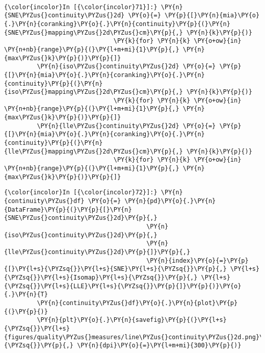     \begin{center}
    \end{center}
    { \hspace*{\fill} \\}

    \begin{Verbatim}[commandchars=\\\{\}]
{\color{incolor}In [{\color{incolor}71}]:} \PY{n}{SNE\PYZus{}continuity\PYZus{}2d} \PY{o}{=} \PY{p}{[}\PY{n}{mia}\PY{o}{.}\PY{n}{coranking}\PY{o}{.}\PY{n}{continuity}\PY{p}{(}\PY{n}{SNE\PYZus{}mapping\PYZus{}2d\PYZus{}cm}\PY{p}{,} \PY{n}{k}\PY{p}{)}
                              \PY{k}{for} \PY{n}{k} \PY{o+ow}{in} \PY{n+nb}{range}\PY{p}{(}\PY{l+m+mi}{1}\PY{p}{,} \PY{n}{max\PYZus{}k}\PY{p}{)}\PY{p}{]}
         \PY{n}{iso\PYZus{}continuity\PYZus{}2d} \PY{o}{=} \PY{p}{[}\PY{n}{mia}\PY{o}{.}\PY{n}{coranking}\PY{o}{.}\PY{n}{continuity}\PY{p}{(}\PY{n}{iso\PYZus{}mapping\PYZus{}2d\PYZus{}cm}\PY{p}{,} \PY{n}{k}\PY{p}{)}
                              \PY{k}{for} \PY{n}{k} \PY{o+ow}{in} \PY{n+nb}{range}\PY{p}{(}\PY{l+m+mi}{1}\PY{p}{,} \PY{n}{max\PYZus{}k}\PY{p}{)}\PY{p}{]}
         \PY{n}{lle\PYZus{}continuity\PYZus{}2d} \PY{o}{=} \PY{p}{[}\PY{n}{mia}\PY{o}{.}\PY{n}{coranking}\PY{o}{.}\PY{n}{continuity}\PY{p}{(}\PY{n}{lle\PYZus{}mapping\PYZus{}2d\PYZus{}cm}\PY{p}{,} \PY{n}{k}\PY{p}{)}
                              \PY{k}{for} \PY{n}{k} \PY{o+ow}{in} \PY{n+nb}{range}\PY{p}{(}\PY{l+m+mi}{1}\PY{p}{,} \PY{n}{max\PYZus{}k}\PY{p}{)}\PY{p}{]}
\end{Verbatim}

    \begin{Verbatim}[commandchars=\\\{\}]
{\color{incolor}In [{\color{incolor}72}]:} \PY{n}{continuity\PYZus{}df} \PY{o}{=} \PY{n}{pd}\PY{o}{.}\PY{n}{DataFrame}\PY{p}{(}\PY{p}{[}\PY{n}{SNE\PYZus{}continuity\PYZus{}2d}\PY{p}{,}
                                       \PY{n}{iso\PYZus{}continuity\PYZus{}2d}\PY{p}{,}
                                       \PY{n}{lle\PYZus{}continuity\PYZus{}2d}\PY{p}{]}\PY{p}{,}
                                       \PY{n}{index}\PY{o}{=}\PY{p}{[}\PY{l+s}{\PYZsq{}}\PY{l+s}{SNE}\PY{l+s}{\PYZsq{}}\PY{p}{,} \PY{l+s}{\PYZsq{}}\PY{l+s}{Isomap}\PY{l+s}{\PYZsq{}}\PY{p}{,} \PY{l+s}{\PYZsq{}}\PY{l+s}{LLE}\PY{l+s}{\PYZsq{}}\PY{p}{]}\PY{p}{)}\PY{o}{.}\PY{n}{T}
         \PY{n}{continuity\PYZus{}df}\PY{o}{.}\PY{n}{plot}\PY{p}{(}\PY{p}{)}
         \PY{n}{plt}\PY{o}{.}\PY{n}{savefig}\PY{p}{(}\PY{l+s}{\PYZsq{}}\PY{l+s}{figures/quality\PYZus{}measures/line\PYZus{}continuity\PYZus{}2d.png}\PY{l+s}{\PYZsq{}}\PY{p}{,} \PY{n}{dpi}\PY{o}{=}\PY{l+m+mi}{300}\PY{p}{)}
\end{Verbatim}

